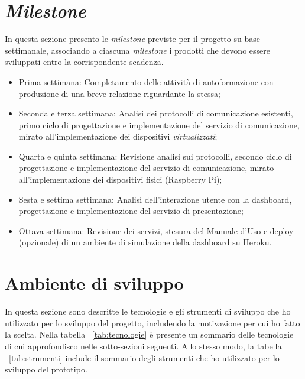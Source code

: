 \clearpage
\section*{\emph{Milestone}}
In questa sezione presento le \emph{milestone} previste per il progetto su base settimanale, associando a ciascuna \emph{milestone} i prodotti che devono essere sviluppati entro la corrispondente scadenza.
\begin{itemize}
	\item Prima settimana: Completamento delle attività di autoformazione con produzione di una breve relazione riguardante la stessa;
	\item Seconda e terza settimana: Analisi dei protocolli di comunicazione esistenti, primo ciclo di progettazione e implementazione del servizio di comunicazione, mirato all'implementazione dei dispositivi \textit{virtualizzati};
	\item Quarta e quinta settimana: Revisione analisi sui protocolli, secondo ciclo di progettazione e implementazione del servizio di comunicazione, mirato all'implementazione dei dispositivi fisici (Raspberry Pi);
	\item Sesta e settima settimana: Analisi dell'interazione utente con la dashboard, progettazione e implementazione del servizio di presentazione;
	\item Ottava settimana: Revisione dei servizi, stesura del Manuale d'Uso e deploy (opzionale) di un ambiente di simulazione della dashboard su Heroku.
\end{itemize}

\section{Ambiente di sviluppo}

In questa sezione sono descritte le tecnologie e gli strumenti di sviluppo che ho utilizzato per lo sviluppo del progetto, includendo la motivazione per cui ho fatto la scelta.
Nella tabella ~\ref{tab:tecnologie} è presente un sommario delle tecnologie di cui approfondisco nelle sotto-sezioni seguenti. Allo stesso modo, la tabella ~\ref{tab:strumenti} include il sommario degli strumenti che ho utilizzato per lo sviluppo del prototipo.

